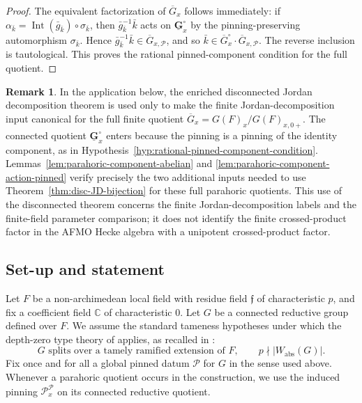 \documentclass{amsart}
\theoremstyle{plain}
\numberwithin{equation}{section}
\theoremstyle{definition}
\newtheorem{remark}[theorem]{Remark}
\newcommand{\cP}{\mathcal{P}}
\newcommand{\ff}{\mathfrak{f}}
\newcommand{\C}{\mathbb{C}}
\begin{document}
\begin{proof}
The equivalent factorization of \(\overline G_x\) follows immediately: if
\(\alpha_{\bar k}=\operatorname{Int}(\bar g_{\bar k})\circ\sigma_{\bar k}\), then
\(\bar g_{\bar k}^{-1}\bar k\) acts on
\(\underline{\mathbf G}_x^\circ\) by the pinning-preserving automorphism
\(\sigma_{\bar k}\).  Hence
\(\bar g_{\bar k}^{-1}\bar k\in\overline G_{x,\cP}\), and so
\(\bar k\in\overline G_x^\circ\cdot\overline G_{x,\cP}\).  The reverse inclusion
is tautological.  This proves the rational pinned-component condition for the
full quotient.
\end{proof}

\begin{remark}
\label{rmk:full-quotient-not-connected-quotient}
In the application below, the enriched disconnected Jordan decomposition theorem
is used only to make the finite Jordan-decomposition input canonical for the
full finite quotient \(\overline G_x=G(F)_x/G(F)_{x,0+}\).  The connected quotient
\(\underline{\mathbf G}_x^\circ\) enters because the pinning is a pinning of the
identity component, as in Hypothesis~\ref{hyp:rational-pinned-component-condition}.
Lemmas~\ref{lem:parahoric-component-abelian} and
\ref{lem:parahoric-component-action-pinned} verify precisely the two additional
inputs needed to use Theorem~\ref{thm:disc-JD-bijection} for these full parahoric
quotients.  This use of the disconnected theorem concerns the finite
Jordan-decomposition labels and the finite-field parameter comparison; it does
not identify the finite crossed-product factor in the AFMO Hecke algebra with a
unipotent crossed-product factor.
\end{remark}

\subsection{Set-up and statement}

Let \(F\) be a non-archimedean local field with residue field \(\ff\) of
characteristic \(p\), and fix a coefficient field \(\C\) of characteristic
\(0\).  Let \(G\) be a connected reductive group defined over \(F\).  We assume
the standard tameness hypotheses under which the depth-zero type theory of
\cite{AFMO24a,AFMO24b} applies, as recalled in \cite[\S1]{ohara2025}:
\begin{equation}\label{eq:tameness}
G \text{ splits over a tamely ramified extension of }F,
\qquad
p\nmid |W_{\mathrm{abs}}(G)|.
\end{equation}
Fix once and for all a global pinned datum \(\cP\) for \(G\) in the sense used
above.  Whenever a parahoric quotient occurs in the construction, we use the
induced pinning \(\cP_x^{\cP}\) on its connected reductive quotient.
\end{document}
